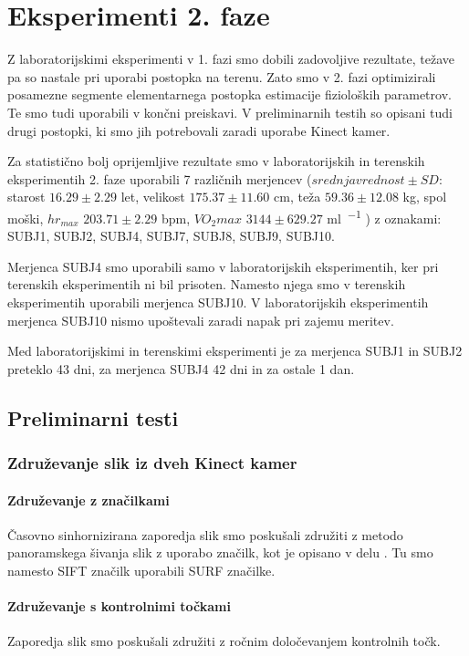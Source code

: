 \section{Eksperimenti 2. faze}
Z laboratorijskimi eksperimenti v 1. fazi smo dobili zadovoljive rezultate, težave pa so nastale pri uporabi postopka na terenu. Zato smo v 2. fazi optimizirali posamezne segmente elementarnega postopka estimacije fizioloških parametrov. Te smo tudi uporabili v končni preiskavi. V preliminarnih testih so opisani tudi drugi postopki, ki smo jih potrebovali zaradi uporabe Kinect kamer.

Za statistično bolj oprijemljive rezultate smo v laboratorijskih in terenskih eksperimentih 2. faze uporabili 7 različnih merjencev  ($srednja vrednost \pm SD$: starost $16.29 \pm 2.29$ let, velikost $175.37 \pm 11.60$ \si{\cm}, teža $59.36 \pm 12.08$ \si{\kg}, spol moški, $hr_{max}$ $203.71 \pm 2.29$ \si{bpm}, $VO_2max$ $3144 \pm 629.27$ \si{\ml\per\min} ) z oznakami: SUBJ1, SUBJ2, SUBJ4, SUBJ7, SUBJ8, SUBJ9, SUBJ10. 

Merjenca SUBJ4 smo uporabili samo v laboratorijskih eksperimentih, ker pri terenskih eksperimentih ni bil prisoten. Namesto njega smo v terenskih eksperimentih uporabili merjenca SUBJ10. V laboratorijskih eksperimentih merjenca SUBJ10 nismo upoštevali zaradi napak pri zajemu meritev.

Med laboratorijskimi in terenskimi eksperimenti je za merjenca SUBJ1 in SUBJ2 preteklo 43 dni, za merjenca SUBJ4 42 dni in za ostale 1 dan.  

\subsection{Preliminarni testi}
\subsubsection{Združevanje slik iz dveh Kinect kamer}\label{sec:zdruzevanje}

\paragraph{Združevanje z značilkami}
Časovno sinhornizirana zaporedja slik smo poskušali združiti z metodo panoramskega šivanja slik z uporabo značilk, kot je opisano v delu \cite{brown2007automatic}. Tu smo namesto SIFT značilk uporabili SURF značilke.


\paragraph{Združevanje s kontrolnimi točkami}
Zaporedja slik smo poskušali združiti z ročnim določevanjem kontrolnih točk.


